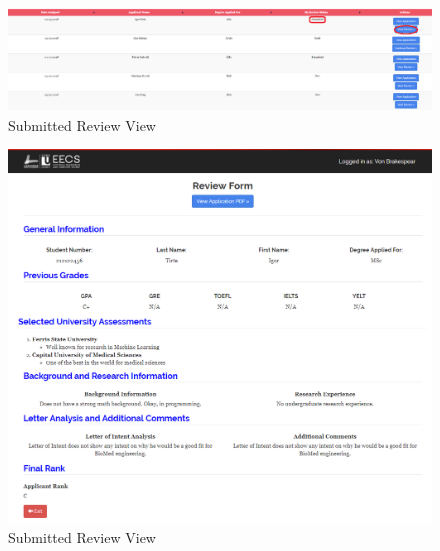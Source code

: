 \documentclass[fontsize=12pt,paper=letter,twoside]{scrartcl}
\begin{document}
\begin{figure}[!htb]
\begin{center}
\includegraphics[width=.8\textwidth]{images/submitted_review.png}
\end{center}
\caption{Submitted Review View}
\label{fig:submitted_review}
\end{figure}

\begin{figure}[!htb]
\begin{center}
\includegraphics[width=.8\textwidth]{images/submit_review_view.png}
\end{center}
\caption{Submitted Review View}
\label{fig:submit_review_view}
\end{figure}
\end{document}
